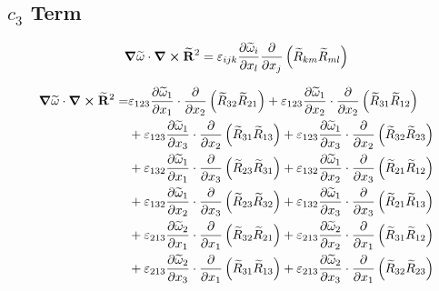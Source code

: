 \newpage
\subsection{$c_{3}$ Term}
\begin{equation}
    \grad \widetilde{\mathbf{\omega}} \cdot \curl \widetilde{\mathbf{R}}^{2} = 
        \varepsilon_{ijk} \pdv{ \widetilde{\omega} _{i}}{x_{l}}
        \pdv{}{x_{j}} \left(\widetilde{R}_{km} \widetilde{R}_{ml} \right)
\end{equation}

\begin{equation}
    \begin{split}
        \grad \filtomega \cdot \curl \filtR^{2} =  &
                \varepsilon_{123}\pdv{\widetilde{\omega}_{1}}{x_{1}}\cdot\pdv{}{x_{2}}\left(\widetilde{R}_{32}\widetilde{R}_{21}\right)    
                +\varepsilon_{123}\pdv{\widetilde{\omega}_{1}}{x_{2}}\cdot\pdv{}{x_{2}}\left(\widetilde{R}_{31}\widetilde{R}_{12}\right)    \\
            &   +\varepsilon_{123}\pdv{\widetilde{\omega}_{1}}{x_{3}}\cdot\pdv{}{x_{2}}\left(\widetilde{R}_{31}\widetilde{R}_{13}\right)    
                +\varepsilon_{123}\pdv{\widetilde{\omega}_{1}}{x_{3}}\cdot\pdv{}{x_{2}}\left(\widetilde{R}_{32}\widetilde{R}_{23}\right)    \\
            &   +\varepsilon_{132}\pdv{\widetilde{\omega}_{1}}{x_{1}}\cdot\pdv{}{x_{3}}\left(\widetilde{R}_{23}\widetilde{R}_{31}\right)    
                +\varepsilon_{132}\pdv{\widetilde{\omega}_{1}}{x_{2}}\cdot\pdv{}{x_{3}}\left(\widetilde{R}_{21}\widetilde{R}_{12}\right)    \\
            &   +\varepsilon_{132}\pdv{\widetilde{\omega}_{1}}{x_{2}}\cdot\pdv{}{x_{3}}\left(\widetilde{R}_{23}\widetilde{R}_{32}\right)    
                +\varepsilon_{132}\pdv{\widetilde{\omega}_{1}}{x_{3}}\cdot\pdv{}{x_{3}}\left(\widetilde{R}_{21}\widetilde{R}_{13}\right)    \\
            &   +\varepsilon_{213}\pdv{\widetilde{\omega}_{2}}{x_{1}}\cdot\pdv{}{x_{1}}\left(\widetilde{R}_{32}\widetilde{R}_{21}\right)    
                +\varepsilon_{213}\pdv{\widetilde{\omega}_{2}}{x_{2}}\cdot\pdv{}{x_{1}}\left(\widetilde{R}_{31}\widetilde{R}_{12}\right)    \\
            &   +\varepsilon_{213}\pdv{\widetilde{\omega}_{2}}{x_{3}}\cdot\pdv{}{x_{1}}\left(\widetilde{R}_{31}\widetilde{R}_{13}\right)    
                +\varepsilon_{213}\pdv{\widetilde{\omega}_{2}}{x_{3}}\cdot\pdv{}{x_{1}}\left(\widetilde{R}_{32}\widetilde{R}_{23}\right)    \\

\end{split}
\end{equation}
